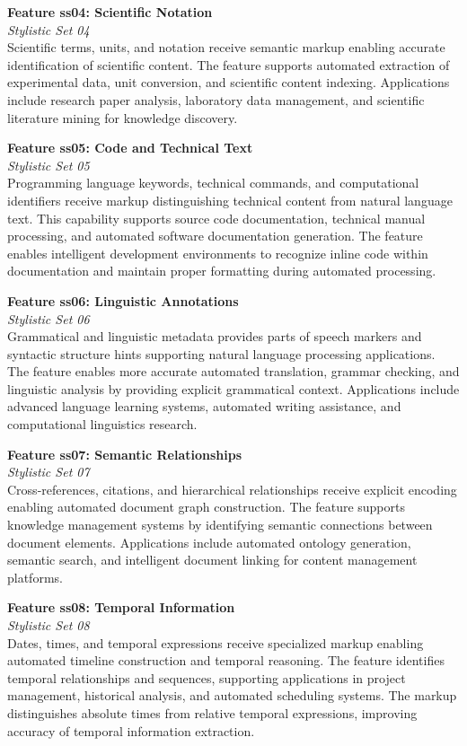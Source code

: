\documentclass[11pt,letterpaper]{article}
\newcommand{\featurebox}[3]{%
\noindent
\colorbox{sectiongray}{%
\begin{minipage}{\dimexpr\textwidth-2\fboxsep}
\vspace{0.3em}
{\color{neutrinosblue}\large\textbf{#1}}\\[0.3em]
{\small\textit{#2}}\\[0.5em]
#3
\vspace{0.3em}
\end{minipage}}
\vspace{1em}
}
\begin{document}
\featurebox{Feature ss04: Scientific Notation}{Stylistic Set 04}{%
Scientific terms, units, and notation receive semantic markup enabling accurate identification of scientific content. The feature supports automated extraction of experimental data, unit conversion, and scientific content indexing. Applications include research paper analysis, laboratory data management, and scientific literature mining for knowledge discovery.
}

\featurebox{Feature ss05: Code and Technical Text}{Stylistic Set 05}{%
Programming language keywords, technical commands, and computational identifiers receive markup distinguishing technical content from natural language text. This capability supports source code documentation, technical manual processing, and automated software documentation generation. The feature enables intelligent development environments to recognize inline code within documentation and maintain proper formatting during automated processing.
}

\featurebox{Feature ss06: Linguistic Annotations}{Stylistic Set 06}{%
Grammatical and linguistic metadata provides parts of speech markers and syntactic structure hints supporting natural language processing applications. The feature enables more accurate automated translation, grammar checking, and linguistic analysis by providing explicit grammatical context. Applications include advanced language learning systems, automated writing assistance, and computational linguistics research.
}

\featurebox{Feature ss07: Semantic Relationships}{Stylistic Set 07}{%
Cross-references, citations, and hierarchical relationships receive explicit encoding enabling automated document graph construction. The feature supports knowledge management systems by identifying semantic connections between document elements. Applications include automated ontology generation, semantic search, and intelligent document linking for content management platforms.
}

\featurebox{Feature ss08: Temporal Information}{Stylistic Set 08}{%
Dates, times, and temporal expressions receive specialized markup enabling automated timeline construction and temporal reasoning. The feature identifies temporal relationships and sequences, supporting applications in project management, historical analysis, and automated scheduling systems. The markup distinguishes absolute times from relative temporal expressions, improving accuracy of temporal information extraction.
}
\end{document}
